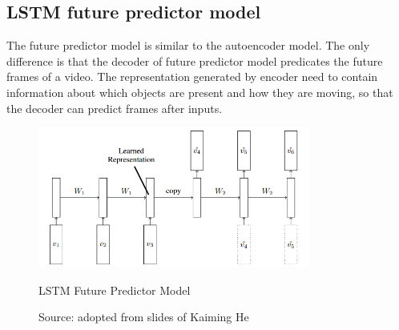 \documentclass[twoside,a4paper,article]{combine}
\begin{document}
\subsection{LSTM future predictor model}
The future predictor model is similar to the autoencoder model. The only difference is that the decoder of future predictor model
predicates the future frames of a video. The representation generated by encoder need to contain information about which objects are 
present and how they are moving, so that the decoder can predict frames after inputs.
\begin{figure}[ht!]
    \includegraphics[width=0.8\textwidth]{predictor}
    \caption{LSTM Future Predictor Model}
    \caption*{Source: adopted from slides of Kaiming He}
    \label{fig:predictor}
\end{figure}
\end{document}
